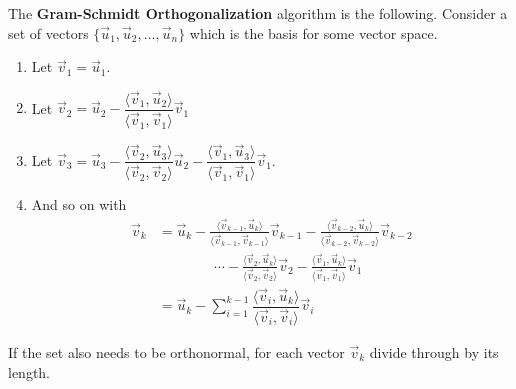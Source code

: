 \begin{Boxed*}
The \textbf{Gram-Schmidt Orthogonalization} algorithm is the following.  Consider a set of vectors $\{\vec{u}_1,\vec{u}_2, \ldots, \vec{u}_n\}$ which is the basis for some vector space.  

\begin{enumerate}
\item Let $\vec{v}_1=\vec{u}_1$. 
\item Let $\vec{v}_2 = \vec{u}_2 - \dfrac{\langle \vec{v}_1,\vec{u}_2 \rangle}{\langle \vec{v}_1,\vec{v}_1 \rangle} \vec{v}_1$
\item Let $\vec{v}_3 = \vec{u}_3 - \dfrac{\langle \vec{v}_2,\vec{u}_3 \rangle}{\langle \vec{v}_2,\vec{v}_2 \rangle} \vec{u}_2-\dfrac{\langle \vec{v}_1,\vec{u}_3 \rangle}{\langle \vec{v}_1,\vec{v}_1 \rangle} \vec{v}_1$. 

\item And so on with 
%
\begin{align*}
\vec{v}_k & = \vec{u}_k - \frac{\langle \vec{v}_{k-1},\vec{u}_k \rangle}{\langle \vec{v}_{k-1},\vec{v}_{k-1} \rangle} \vec{v}_{k-1}-\frac{\langle \vec{v}_{k-2},\vec{u}_k \rangle}{\langle \vec{v}_{k-2},\vec{v}_{k-2} \rangle} \vec{v}_{k-2}  \\
& \qquad \qquad \cdots - \frac{\langle \vec{v}_2,\vec{u}_k \rangle}{\langle \vec{v}_2,\vec{v}_2 \rangle} \vec{v}_2-\frac{\langle \vec{v}_1,\vec{u}_k \rangle}{\langle \vec{v}_1,\vec{v}_1 \rangle} \vec{v}_1 \\
& = \vec{u}_k - \sum_{i=1}^{k-1} \dfrac{\langle \vec{v}_i, \vec{u}_k \rangle}{\langle \vec{v}_i,\vec{v}_i \rangle} \vec{v}_i 
\end{align*}
\end{enumerate}

If the set also needs to be orthonormal, for each vector $\vec{v}_k$ divide through by its length.  
\end{Boxed*}


